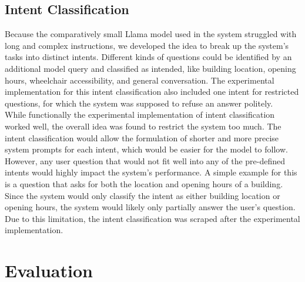 \documentclass{article}
\begin{document}

\subsection{Intent Classification}
Because the comparatively small Llama model used in the system struggled with long and complex instructions, we developed the idea to break up the system's tasks into distinct intents. Different kinds of questions could be identified by an additional model query and classified as intended, like building location, opening hours, wheelchair accessibility, and general conversation. The experimental implementation for this intent classification also included one intent for restricted questions, for which the system was supposed to refuse an answer politely.\\

While functionally the experimental implementation of intent classification worked well, the overall idea was found to restrict the system too much. The intent classification would allow the formulation of shorter and more precise system prompts for each intent, which would be easier for the model to follow. However, any user question that would not fit well into any of the pre-defined intents would highly impact the system's performance. A simple example for this is a question that asks for both the location and opening hours of a building. Since the system would only classify the intent as either building location or opening hours, the system would likely only partially answer the user's question. Due to this limitation, the intent classification was scraped after the experimental implementation.

\section{Evaluation} \label{sec:eval}
\end{document}
